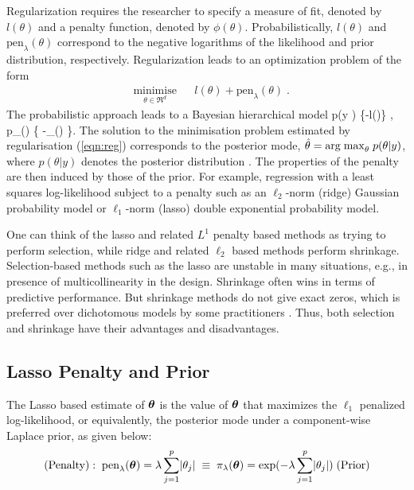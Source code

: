 \documentclass[11pt]{article}
\numberwithin{equation}{section}
\begin{document}
Regularization requires the researcher to specify a measure of fit, denoted by $l(\theta)$ and a penalty function, denoted by $ \phi(\theta)$. Probabilistically,  $l(\theta)$ and $\text{pen}_{\lambda}(\theta)$ correspond to the negative logarithms of the likelihood and prior distribution, respectively.  Regularization leads to an optimization problem of the form 
\begin{equation}
\label{eqn:reg}
\begin{aligned}
& \underset{\theta \in \Re^d}{\text{minimise}}
& & l(\theta) + \text{pen}_{\lambda}(\theta) \; . 
\end{aligned}
\end{equation}
The probabilistic approach leads to a Bayesian hierarchical model
\beq
p(y \mid \theta) \propto \exp\{-l(\theta)\} \; , \quad p_{\lambda}(\theta) \propto \exp\{ -_{\lambda}(\theta) \}. \label{eq:pen}
\eeq
The solution to the minimisation problem estimated by regularisation (\ref{eqn:reg}) corresponds to the posterior mode, $ \hat{\theta} = {\rm arg \; max}_\theta \; p( \theta|y) $, where $ p(\theta|y)$ denotes the posterior distribution \citep{polson2015mixtures}. The properties of the penalty are then induced by those of the prior. For example, regression with a least squares log-likelihood subject to a penalty such as an $\ell_2$-norm (ridge) \citep{hoerl70} Gaussian probability model or $\ell_1$-norm (lasso) \citep{tibshirani96} double exponential probability model. 

One can think of the lasso and related $L^1$ penalty based methods as trying to perform selection, while ridge and related $\ell_2$ based methods perform shrinkage. Selection-based methods such as the lasso are unstable in many situations, e.g., in presence of multicollinearity in the design. Shrinkage often wins in terms of predictive performance. But shrinkage methods do not give exact zeros, which is preferred over dichotomous models by some practitioners \citep{stephens2009bayesian}. Thus, both selection and shrinkage have their advantages and disadvantages. 

\subsection{Lasso Penalty and Prior}\label{sec:lasso}

The Lasso based estimate of $\boldsymbol{\theta}$ is the value of $\boldsymbol{\theta}$ that maximizes the $\ell_1$ penalized log-likelihood, or equivalently, the posterior mode under a component-wise Laplace prior, as given below: 
\begin{equation}
(\text{Penalty}): \; \text{pen}_{\lambda}(\boldsymbol{\theta}) = \lambda \sum_{j = 1}^{p} \lvert\theta_j\rvert \; \equiv \; \pi_{\lambda}(\boldsymbol{\theta}) = \exp( - \lambda \sum_{j = 1}^{p} \lvert\theta_j\rvert) \; (\text{Prior})
\end{equation}
\end{document}
